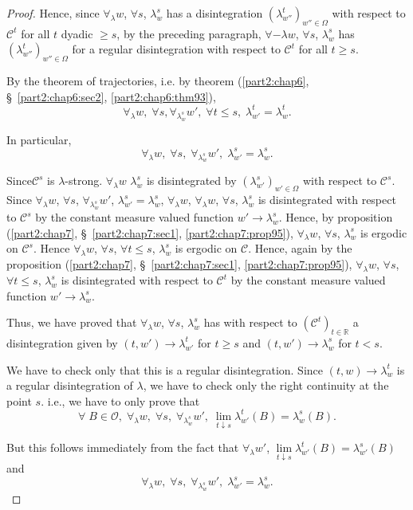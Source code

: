 \begin{proof}
Hence, since $\forall_\lambda w$, $\forall s$, $\lambda^s_w$ has a
disintegration $(\lambda^t_{w''})_{w'' \in \Omega}$ with respect to
$\mathscr{C}^t$ for all $t$ dyadic $\geq s$, by the preceding
paragraph, $\forall-\lambda w$, $\forall s$, $\lambda^s_w$ has
$(\lambda^t_{w''})_{w'' \in \Omega}$ for a regular disintegration with
respect to $\mathscr{C}^t$ for all $t \geq s$.

By the theorem of trajectories, i.e. by theorem (\ref{part2:chap6},
\S\ \ref{part2:chap6:sec2}, \ref{part2:chap6:thm93}), 
$$
\forall_\lambda w, \; \forall s, \forall_{\lambda^s_w} w', \; \forall
t \leq s, \; \lambda^t_{w'} = \lambda^t_w. 
$$

In particular,
$$
\forall_\lambda w, \; \forall s, \; \forall_{\lambda^s_w} w' , \;
\lambda^s_{w'} = \lambda^s_w.
$$

Since\pageoriginale $\mathscr{C}^s$ is
$\lambda$-strong. $\forall_\lambda w$ $\lambda^s_w$ is disintegrated
by $(\lambda^s_{w'})_{w' \in\Omega}$ with respect to
$\mathscr{C}^s$. Since $\forall_\lambda w$, $\forall s$,
$\forall_{\lambda^s_w} w'$, $\lambda^s_{w'} = \lambda^s_w$,
$\forall_\lambda w$, $\forall_\lambda w$, $\forall s$, $\lambda^s_w$
is disintegrated with respect to $\mathscr{C}^s$ by the constant
measure valued function $w' \to \lambda^s_w$. Hence, by proposition
(\ref{part2:chap7}, \S\ \ref{part2:chap7:sec1},
\ref{part2:chap7:prop95}), $\forall_\lambda w$, $\forall s$,
$\lambda^s_w$ is 
ergodic on $\mathscr{C}^s$. Hence $\forall_\lambda w$, $\forall s$,
$\forall t \leq s$, $\lambda^s_w$ is ergodic on $\mathscr{C}$. Hence,
again by the proposition (\ref{part2:chap7},
\S\ \ref{part2:chap7:sec1}, \ref{part2:chap7:prop95}), $\forall_\lambda w$, 
$\forall s$, $\forall t \leq s$, $\lambda^s_w$ is disintegrated with
respect to $\mathscr{C}^t$ by the constant measure valued function $w'
\to \lambda^s_w$. 
 
Thus, we have proved that $\forall_\lambda w$, $\forall s$,
$\lambda^s_w$ has with respect to $(\mathscr{C}^t)_{t \in \mathbb{R}}$
a disintegration given by $(t, w') \to \lambda^t_{w'}$ for $t \geq s$
and $(t,w') \to \lambda^s_w$ for $t <s$.

We have to check only that this is a regular disintegration. Since
$(t,w) \to \lambda^t_w$ is a regular disintegration of $\lambda$, we
have to check only the right continuity at the point $s$. i.e., we
have to only prove that 
$$
\forall \; B \in \mathscr{O}, \; \forall_\lambda w, \; \forall s, \;
\forall_{\lambda^s_w} w', \; \lim\limits_{t \downarrow s}
\lambda^t_{w'}(B) = \lambda^s_w(B). 
$$

But this follows immediately from the fact that $\forall_\lambda w'$,
$\lim\limits_{t \downarrow s} \lambda^t_{w'} (B) = \lambda^s_{w'} (B)$
and 
$$
\forall_\lambda w, \; \forall s, \; \forall_{\lambda^s_w} w', \;
\lambda^s_{w'} = \lambda^s_w.
$$
\end{proof}

